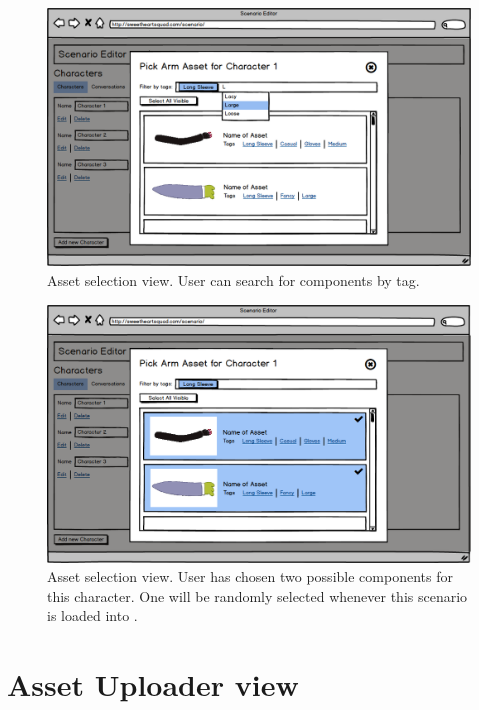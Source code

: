 \begin{figure}[p]
\centering\includegraphics[width=0.95\linewidth, height=0.7\paperheight, keepaspectratio=true]{images/Character3}
  \caption{Asset selection view. User can search for components by tag.}
  \label{fig:mockup_char_3}
\end{figure}

\begin{figure}[p]
\centering\includegraphics[width=0.95\linewidth, height=0.7\paperheight, keepaspectratio=true]{images/Character4}
  \caption{Asset selection view. User has chosen two possible components for this character. One will be randomly selected whenever this scenario is loaded into \ourgame{}.}
  \label{fig:mockup_char_4}
\end{figure}

\clearpage
\section{Asset Uploader view}

